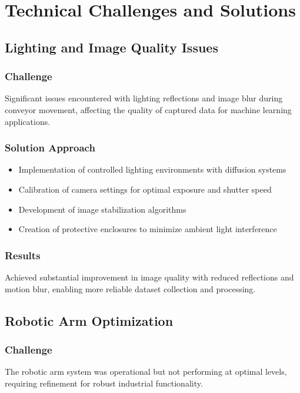 \documentclass[12pt]{article}
\begin{document}
\newpage

\section{Technical Challenges and Solutions}

\subsection{Lighting and Image Quality Issues}
\subsubsection{Challenge}
Significant issues encountered with lighting reflections and image blur during conveyor movement, affecting the quality of captured data for machine learning applications.

\subsubsection{Solution Approach}
\begin{itemize}
\item Implementation of controlled lighting environments with diffusion systems
\item Calibration of camera settings for optimal exposure and shutter speed
\item Development of image stabilization algorithms
\item Creation of protective enclosures to minimize ambient light interference
\end{itemize}

\subsubsection{Results}
Achieved substantial improvement in image quality with reduced reflections and motion blur, enabling more reliable dataset collection and processing.

\subsection{Robotic Arm Optimization}
\subsubsection{Challenge}
The robotic arm system was operational but not performing at optimal levels, requiring refinement for robust industrial functionality.
\end{document}
